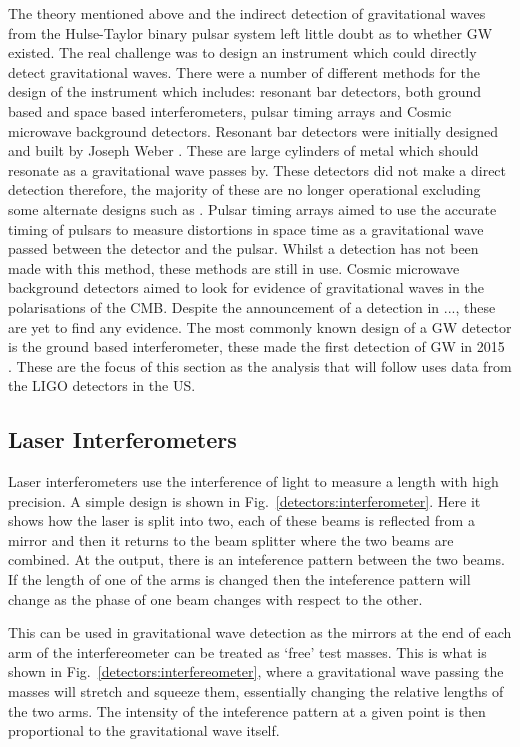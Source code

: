 The theory mentioned above and the indirect detection of gravitational waves from the Hulse-Taylor binary pulsar system left little doubt as to whether \ac{GW} existed. 
The real challenge was to design an instrument which could directly detect gravitational waves.
There were a number of different methods for the design of the instrument which includes: resonant bar detectors, both ground based and space based interferometers, pulsar timing arrays and Cosmic microwave background detectors. 
Resonant bar detectors were initially designed and built by Joseph Weber \citep{}.
These are large cylinders of metal which should resonate as a gravitational wave passes by. 
These detectors did not make a direct detection therefore, the majority of these are no longer operational excluding some alternate designs such as \citep{}.
Pulsar timing arrays aimed to use the accurate timing of pulsars to measure distortions in space time as a gravitational wave passed between the detector and the pulsar. 
Whilst a detection has not been made with this method, these methods are still in use.
Cosmic microwave background detectors aimed to look for evidence of gravitational waves in the polarisations of the CMB. 
Despite the announcement of a detection in ..., these are yet to find any evidence.
The most commonly known design of a \ac{GW} detector is the ground based interferometer, these made the first detection of \ac{GW} in 2015 \citep{}.
These are the focus of this section as the analysis that will follow uses data from the \ac{LIGO} detectors in the US.

\subsection{Laser Interferometers}

Laser interferometers use the interference of light to measure a length with high precision.
A simple design is shown in Fig.~\ref{detectors:interferometer}. 
Here it shows how the laser is split into two, each of these beams is reflected from a mirror and then it returns to the beam splitter where the two beams are combined.
At the output, there is an inteference pattern between the two beams.
If the length of one of the arms is changed then the inteference pattern will change as the phase of one beam changes with respect to the other.

This can be used in gravitational wave detection as the mirrors at the end of each arm of the interfereometer can be treated as `free' test masses.
This is what is shown in Fig.~\ref{detectors:interfereometer}, where a gravitational wave passing the masses will stretch and squeeze them, essentially changing the relative lengths of the two arms.
The intensity of the inteference pattern at a given point is then proportional to the gravitational wave itself.

